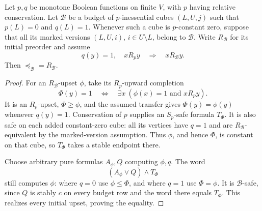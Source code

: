 \begin{lemma}
\label{core:lem:conservation-buffer}
Let $p,q$ be monotone Boolean functions on finite $V$, with $p$ having
relative conservation. Let $\mathcal B$ be a budget of $p$-inessential
cubes $(L,U,j)$ such that $p(L)=0$ and $q(L)=1$.
Whenever such a cube is $p$-constant zero, suppose that all its marked
versions $(L,U,i)$, $i\in U\setminus L$, belong to $\mathcal B$.
Write $R_{\mathcal B}$ for its initial preorder and assume
\[
 q(y)=1,\quad xR_py\quad\Longrightarrow\quad xR_{\mathcal B}y.
\]
Then $\preceq_{\mathcal B}=R_{\mathcal B}$.
\end{lemma}
\begin{proof}
For an $R_{\mathcal B}$-upset $\phi$, take its $R_p$-upward completion
\[
 \Phi(y)=1\quad\Longleftrightarrow\quad
 \exists x\ (\phi(x)=1\text{ and }xR_py).
\]
It is an $R_p$-upset, $\Phi\geq\phi$, and the assumed transfer gives
$\Phi(y)=\phi(y)$ whenever $q(y)=1$.
Conservation of $p$ supplies an $S_p$-safe formula $T_\Phi$.
It is also safe on each added constant-zero cube: all its vertices have
$q=1$ and are $R_{\mathcal B}$-equivalent by the marked-version
assumption. Thus $\phi$, and hence $\Phi$, is constant on that cube,
so $T_\Phi$ takes a stable endpoint there.

Choose arbitrary pure formulas $A_\phi,Q$ computing $\phi,q$.
The word
\[
 (A_\phi\vee Q)\wedge T_\Phi
\]
still computes $\phi$: where $q=0$ use $\phi\leq\Phi$, and where
$q=1$ use $\Phi=\phi$. It is $\mathcal B$-safe, since $Q$ is stably
$c$ on every budget row and the word there equals $T_\Phi$.
This realizes every initial upset, proving the equality.
\end{proof}

